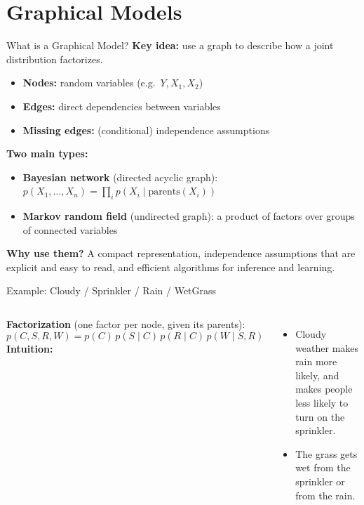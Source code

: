 \documentclass[aspectratio=169]{beamer}
\begin{document}
\section{Graphical Models}

\begin{frame}{What is a Graphical Model?}
\textbf{Key idea:} use a graph to describe how a joint distribution factorizes.
\begin{itemize}
  \item \textbf{Nodes:} random variables (e.g.\ $Y, X_1, X_2$)
  \item \textbf{Edges:} direct dependencies between variables
  \item \textbf{Missing edges:} (conditional) independence assumptions
\end{itemize}
\vspace{0.2cm}
\textbf{Two main types:}
\begin{itemize}
  \item \textbf{Bayesian network} (directed acyclic graph):
        $p(X_1,\ldots,X_n) = \prod_i p(X_i\mid \text{parents}(X_i))$
  \item \textbf{Markov random field} (undirected graph): a product of factors over groups of connected variables
\end{itemize}
\vspace{0.2cm}
\textbf{Why use them?} A compact representation, independence assumptions that are explicit and easy to read, and efficient algorithms for inference and learning.
\end{frame}

\begin{frame}{Example: Cloudy / Sprinkler / Rain / WetGrass}
\begin{columns}[c]
\centering
{}
\textbf{Factorization} (one factor per node, given its parents):
\[
  p(C,S,R,W) = p(C)\,p(S\mid C)\,p(R\mid C)\,p(W\mid S,R)
\]
\textbf{Intuition:}
\begin{itemize}
  \item Cloudy weather makes rain more likely, and makes people less likely to turn on the sprinkler.
  \item The grass gets wet from the sprinkler or from the rain.
\end{itemize}
\end{columns}
\end{frame}
\end{document}
